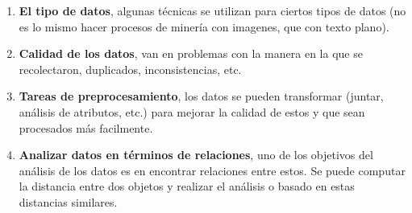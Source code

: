 \documentclass{article}
\begin{document}
\begin{enumerate}
  \item \textbf{El tipo de datos}, algunas técnicas se utilizan para ciertos tipos de datos (no es lo mismo hacer procesos de minería con imagenes, que con texto plano).
  \item \textbf{Calidad de los datos}, van en problemas con la manera en la que se recolectaron, duplicados, inconsistencias, etc.
  \item \textbf{Tareas de preprocesamiento}, los datos se pueden transformar (juntar, análisis de atributos, etc.) para mejorar la calidad de estos y que sean procesados más facilmente.
  \item \textbf{Analizar datos en términos de relaciones}, uno de los objetivos del análisis de los datos es en encontrar relaciones entre estos. Se puede computar la distancia entre dos objetos y realizar el análisis o basado en estas distancias similares.
\end{enumerate}
\end{document}
